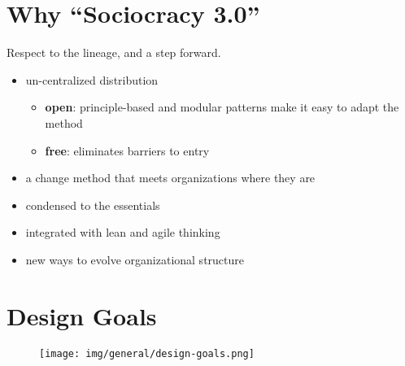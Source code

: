 \chapter{Why ``Sociocracy 3.0''}
\label{whysociocracy3.0}

Respect to the lineage, and a step forward.

\begin{itemize}
\item un-centralized distribution

\begin{itemize}
\item \textbf{open}: principle-based and modular patterns make it easy to adapt the method

\item \textbf{free}: eliminates barriers to entry

\end{itemize}

\item a change method that meets organizations where they are

\item condensed to the essentials

\item integrated with lean and agile thinking

\item new ways to evolve organizational structure

\end{itemize}

\chapter{Design Goals}
\label{designgoals}

\begin{figure}[htbp]
\centering
\texttt{[image: img/general/design-goals.png]}
\end{figure}

